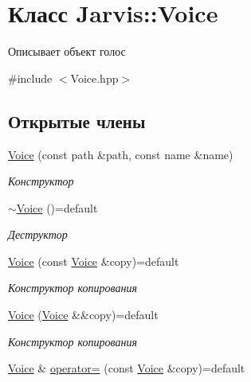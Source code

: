 \hypertarget{classJarvis_1_1Voice}{}\section{Класс Jarvis\+:\+:Voice}
\label{classJarvis_1_1Voice}


Описывает объект голос  




{\ttfamily \#include $<$Voice.\+hpp$>$}

\subsection*{Открытые члены}
\begin{DoxyCompactItemize}
\item 
\hyperlink{classJarvis_1_1Voice_a79c708aebcb92b2d3f74de9992f1082a}{Voice} (const path \&path, const name \&name)
\begin{DoxyCompactList}\small\item\em Конструктор \end{DoxyCompactList}\item 
\mbox{\label{classJarvis_1_1Voice_a6bb0bc7ce0a275c03b8cc1b7cd45ea7e}} 
\hyperlink{classJarvis_1_1Voice_a6bb0bc7ce0a275c03b8cc1b7cd45ea7e}{$\sim$\+Voice} ()=default
\begin{DoxyCompactList}\small\item\em Деструктор \end{DoxyCompactList}\item 
\hyperlink{classJarvis_1_1Voice_ab1b0b2c2bb6d175b34970086cce05245}{Voice} (const \hyperlink{classJarvis_1_1Voice}{Voice} \&copy)=default
\begin{DoxyCompactList}\small\item\em Конструктор копирования \end{DoxyCompactList}\item 
\hyperlink{classJarvis_1_1Voice_a3bac269758c6f299fbd1c661f3154747}{Voice} (\hyperlink{classJarvis_1_1Voice}{Voice} \&\&copy)=default
\begin{DoxyCompactList}\small\item\em Конструктор копирования \end{DoxyCompactList}\item 
\hyperlink{classJarvis_1_1Voice}{Voice} \& \hyperlink{classJarvis_1_1Voice_ab90791a6daeab735274366ca8ce69da2}{operator=} (const \hyperlink{classJarvis_1_1Voice}{Voice} \&copy)=default

\end{DoxyCompactItemize}
